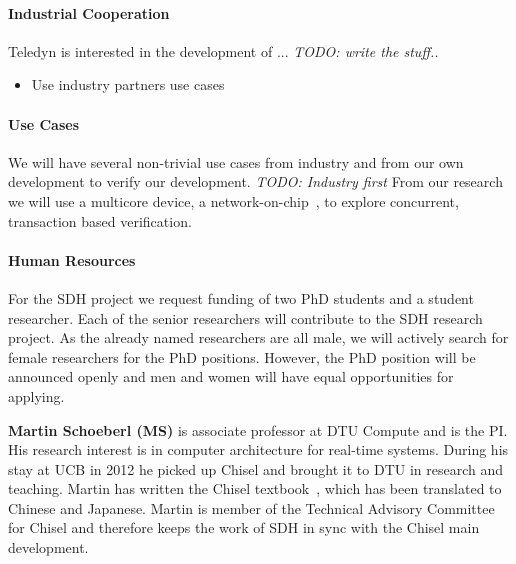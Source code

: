\documentclass[fleqn,12pt]{article}
\newcommand{\todo}[1]{{\it TODO: #1}}
\begin{document}
\paragraph*{Industrial Cooperation}

Teledyn is interested in the development of ... \todo{write the stuff..}

\begin{itemize}
\item Use industry partners use cases
\end{itemize}


\paragraph*{Use Cases}

We will have several non-trivial use cases from industry and from our own development to verify
our development. \todo{Industry first}
From our research we will use a multicore device, a network-on-chip~\cite{s4noc:nocarc2019},
to explore concurrent, transaction based verification.

\paragraph*{Human Resources}

For the SDH project we request funding of two PhD students and a student researcher.
Each of the senior researchers will contribute to the SDH research project.
%
%
As the already named researchers are all male, we will actively search
for female researchers for the PhD positions.
However, the PhD position will be announced openly and men and women
will have equal opportunities for applying.


{\bf Martin Schoeberl (MS)} is associate professor at DTU Compute and is the PI.
His research interest is in computer architecture for real-time systems. During his stay
at UCB in 2012 he picked up Chisel and brought it to DTU in research and teaching.
Martin has written the Chisel textbook~\cite{chisel:book}, which has been translated
to Chinese and Japanese. Martin is member of the Technical Advisory Committee for
Chisel and therefore keeps the work of SDH in sync with the Chisel main development.
\end{document}
